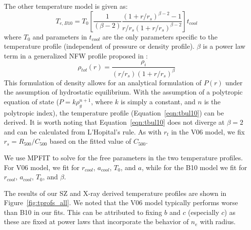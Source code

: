 \documentclass[iop,numberedappendix,apj]{emulateapj}
\begin{document}
The other temperature model \citep{bulbul2010} is given as:
\begin{equation}
  T_{e,B10} = T_0 \left[ \frac{1}{(\beta - 2)} \frac{(1+ r/r_s)^{\beta-2} - 1}{r/r_s (1 + r/r_s)^{\beta-2}}\right] t_{cool}
  \label{eqn:tbul10}
\end{equation}
where $T_0$ and parameters in $t_{cool}$ are the only parameters specific to the temperature profile (independent of
pressure or density profile). $\beta$ is a power law term in a generalized NFW profile proposed in \citet{bulbul2010}:
\begin{equation}
  \rho_{tot}(r) = \frac{\rho_i}{(r/r_s)(1+r/r_s)^{\beta}}
  \label{eqn:bulgnfw}
\end{equation}
This formulation of density allows for an analytical formulation of $P(r)$ under the assumption of hydrostatic 
equilibrium. With the assumption of a polytropic equation of state ($P = k \rho_g^{n+1}$, where $k$ is simply a
constant, and $n$ is the polytropic index), the temperature profile (Equation~\ref{eqn:tbul10}) can be derived.
It is worth noting that Equation~\ref{eqn:tbul10} does not diverge at $\beta = 2$ and can be calculated from
L'Hopital's rule. As with $r_t$ in the V06 model, we fix $r_s = R_{500}/C_{500}$ based on the fitted value of $C_{500}$.

We use MPFIT \citep{markwardt2009} to solve for the free parameters in the two temperature profiles. For
V06 model, we fit for  $r_{cool}$, $a_{cool}$, $T_0$, and $a$, while for the B10 model we fit for $r_{cool}$, $a_{cool}$, 
$T_0$, and $\beta$.

The results of our SZ and X-ray derived temperature profiles are shown in Figure~\ref{fig:tprofs_all}. 
We noted that the V06 model typically performs worse than B10 in our fits. This can be
attributed to fixing $b$ and $c$ (especially $c$) as these are fixed at power laws that incorporate the
behavior of $n_e$ with radius.
\end{document}
